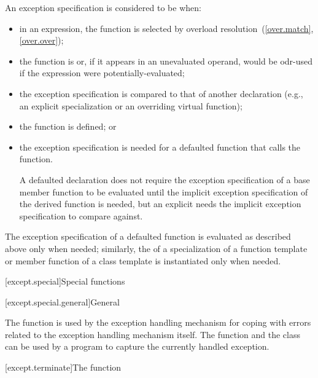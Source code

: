 \pnum
An exception specification is considered to be  when:
\begin{itemize}
\item in an expression, the function is selected by
overload resolution~(\ref{over.match}, \ref{over.over});

\item the function is  or, if it appears in an
unevaluated operand, would be odr-used if the expression were
potentially-evaluated;

\item the exception specification is compared to that of another
declaration (e.g., an explicit specialization or an overriding virtual
function);

\item the function is defined; or

\item the exception specification is needed for a defaulted
function that calls the function.
\begin{note}
A defaulted declaration does not require the
exception specification of a base member function to be evaluated
until the implicit exception specification of the derived
function is needed, but an explicit  needs
the implicit exception specification to compare against.
\end{note}
\end{itemize}
The exception specification of a defaulted
function is evaluated as described above only when needed; similarly, the
 of a specialization of a function
template or member function of a class template is instantiated only when
needed.
%

[except.special]{Special functions}

[except.special.general]{General}

\pnum
The function 
is used by the exception
handling mechanism for coping with errors related to the exception handling
mechanism itself. The function
 and the class
 can be used by a program to
capture the currently handled exception.

[except.terminate]{The  function}

